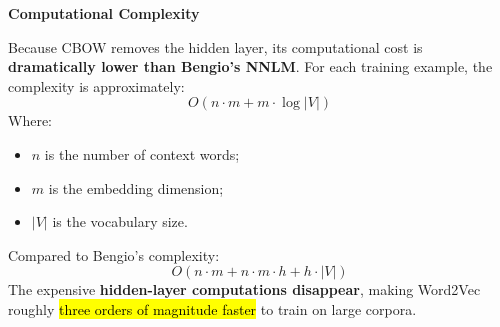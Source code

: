\highspace
\begin{flushleft}
    \textcolor{Green3}{ \textbf{Computational Complexity}}
\end{flushleft}
Because CBOW removes the hidden layer, its computational cost is \textbf{dramatically lower than Bengio's NNLM}. For each training example, the complexity is approximately:
\begin{equation}\label{eq:cbow-complexity}
    O\left(n \cdot m + m \cdot \log\left|V\right|\right)
\end{equation}
Where:
\begin{itemize}
    \item $n$ is the number of context words;
    \item $m$ is the embedding dimension;
    \item $\left|V\right|$ is the vocabulary size.
\end{itemize}
Compared to Bengio's complexity:
\begin{equation*}
    O\left(n \cdot m + n \cdot m \cdot h + h \cdot \left|V\right|\right)
\end{equation*}
The expensive \textbf{hidden-layer computations disappear}, making Word2Vec roughly \hl{three orders of magnitude faster} to train on large corpora.